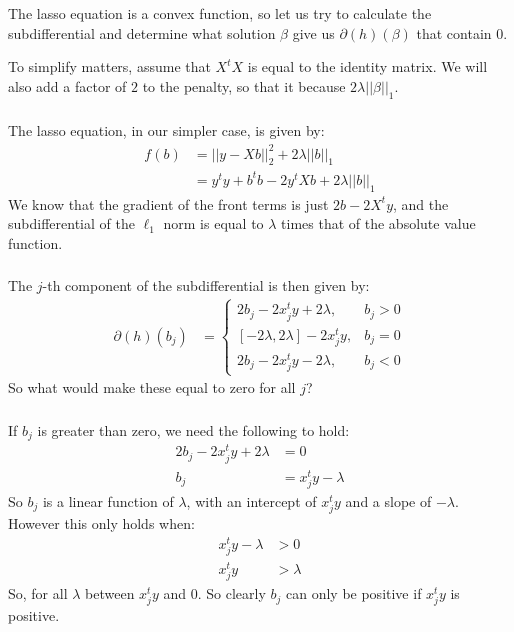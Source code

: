 \begin{frame}[fragile] \frametitle{}

The lasso equation is a convex function, so let us try to calculate the subdifferential
and determine what solution $\beta$ give us $\partial(h)(\beta)$ that contain $0$.

To simplify matters, assume that $X^tX$ is equal to the identity matrix. We will also
add a factor of $2$ to the penalty, so that it because $2 \lambda ||\beta||_1$.

\end{frame}

\begin{frame}[fragile] \frametitle{}

The lasso equation, in our simpler case, is given by:
\begin{align*}
f(b) &= || y - Xb ||_2^2 + 2 \lambda ||b||_1 \\
&= y^t y + b^t b - 2 y^t X b + 2 \lambda || b ||_1
\end{align*}
\pause We know that the gradient of the front terms is just $2b - 2 X^t y$,
and the subdifferential of the $\ell_1$ norm is equal to $\lambda$ times
that of the absolute value function.

\end{frame}

\begin{frame}[fragile] \frametitle{}

The $j$-th component of the subdifferential is then given by:
\begin{align*}
\partial(h)(b_j) &= \left\{ \begin{array}{ll}
2 b_j - 2 x_j^t y + 2 \lambda, &b_j > 0 \\[0pt]
[-2\lambda,2\lambda] - 2 x_j^t y, &b_j = 0 \\[0pt]
2 b_j - 2 x_j^t y - 2\lambda, &b_j < 0
\end{array} \right.
\end{align*}
So what would make these equal to zero for all $j$?

\end{frame}

\begin{frame}[fragile] \frametitle{}

If $b_j$ is greater than zero, we need the following to hold:
\begin{align*}
2 b_j - 2 x_j^t y + 2 \lambda &= 0 \\
b_j &= x_j^t y - \lambda
\end{align*}
\pause So $b_j$ is a linear function of $\lambda$, with an intercept of
$x_j^t y$ and a slope of $-\lambda$. \pause However this only holds when:
\begin{align*}
x_j^t y - \lambda &> 0 \\
x_j^t y &> \lambda
\end{align*}
So, for all $\lambda$ between $x_j^t y$ and $0$. So clearly $b_j$
can only be positive if $x_j^t y$ is positive.

\end{frame}

